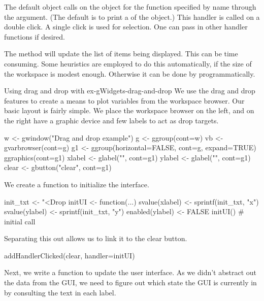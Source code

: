 The default  object calls
 on the object for the function specified by name
through the  argument. (The default is
to print a  of the object.) This handler is called on a
double click. A single click is used for selection. One can pass in
other handler functions if desired.  


The  method will update the list of items
being displayed.  This can be time consuming. Some heuristics
are employed to do this automatically, if the size of the workspace is
modest enough. Otherwise it can be done by programmatically.

\begin{example}{Using drag and drop with }{ex-gWidgets-drag-and-drop}
  We use the drag and drop features to create a means to plot
  variables from the workspace browser.  Our basic layout is fairly
  simple. We place the workspace browser on the left, and on the right
  have a graphic device and few labels to act as drop targets.
\begin{Schunk}
\begin{Sinput}
 w <- gwindow("Drag and drop example")
 g <- ggroup(cont=w)
 vb <- gvarbrowser(cont=g)
 g1 <- ggroup(horizontal=FALSE, cont=g, expand=TRUE)
 ggraphics(cont=g1)
 xlabel <- glabel("", cont=g1)
 ylabel <- glabel("", cont=g1)
 clear <- gbutton("clear", cont=g1)
\end{Sinput}
\end{Schunk}
%
We create a function to initialize the interface.
\begin{Schunk}
\begin{Sinput}
 init_txt <- "<Drop %
 initUI <- function(...) {
   svalue(xlabel) <- sprintf(init_txt, "x")
   svalue(ylabel) <- sprintf(init_txt, "y")
   enabled(ylabel) <- FALSE
 }
 initUI()                                # initial call
\end{Sinput}
\end{Schunk}
%
Separating this out allows us to link it to the clear button.
\begin{Schunk}
\begin{Sinput}
 addHandlerClicked(clear, handler=initUI)
\end{Sinput}
\end{Schunk}
%
Next, we write a function to update the user interface. As we didn't
abstract out the data from the GUI,
we need to figure out which state the GUI is currently in by
consulting the text in each label.

\end{example}
